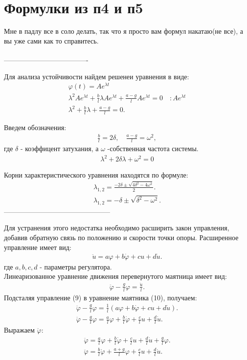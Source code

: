 \documentclass[12pt]{article}
\begin{document}
\section{Формулки из п4 и п5}

Мне в падлу все в соло делать, так что я просто вам формул накатаю(не все), а вы уже сами как то справитесь.
\\\\
-------------------------------------

Для анализа устойчивости найдем решенеи уравнения в виде:
\begin{gather}
\varphi(t)=Ae^{\lambda t}\nonumber\\
\lambda^2Ae^{\lambda t}+\frac{b}{l}\lambda Ae^{\lambda t}+\frac{a-g}{l} Ae^{\lambda t}=0    \quad:Ae^{\lambda t}\nonumber\\
\lambda^2+\frac{b}{l}\lambda+\frac{a-g}{l}=0.\nonumber
\end{gather}

Введем обозначения:
\begin{gather}
\frac{b}{l}=2\delta, \quad \frac{a-g}{l}=\omega^2,\nonumber
\end{gather}
где $\delta$ - коэффицент затухания, а $\omega$ -собственная частота системы.
\begin{gather}
\lambda^2 +2\delta\lambda+\omega^2=0
\end{gather}

Корни характеристического уравнения находятся по формуле:
\begin{gather}
\lambda_{1,2} = \frac{-2\delta\pm\sqrt{4\delta^2-4\omega^2}}{2}.\nonumber\\
\lambda_{1,2} = -\delta \pm \sqrt{\delta^2-\omega^2}.
\end{gather}
-----------------------------------------------

Для устранения этого недостатка необходимо расширить закон управления, добавив обратную
связь по положению и скорости точки опоры. Расширенное управление имеет вид:
\begin{gather}
\ddot{u}=a\varphi+b\dot{\varphi} +cu+d\dot{u}.
\end{gather}
где $a,b,c,d$ - параметры регулятора.\\
Линеаризованное уравнение движения перевернутого маятница имеет вид:
\begin{gather}
\ddot{\varphi}- \frac{g}{l}\varphi=\frac{\ddot{u}}{l}.
\end{gather}
Подсталяя управление (9) в уравнение маятника (10), получаем:
\begin{gather}
\ddot{\varphi}-\frac{g}{l}\varphi=\frac{1}{l}(a\varphi+b\dot{\varphi}+cu+d\dot{u}).\nonumber\\
\ddot{\varphi}-\frac{g}{l}\varphi=\frac{a}{l}\varphi+\frac{b}{l}\dot{\varphi}+\frac{c}{l}u+\frac{d}{l}\dot{u}.
\end{gather}
Выражаем $\ddot{\varphi}$:
\begin{gather}
\ddot{\varphi}=\frac{a}{l}\varphi+\frac{b}{l}\dot{\varphi}+\frac{c}{l}u+\frac{d}{l}\dot{u}+\frac{g}{l}\varphi.\nonumber\\
\ddot{\varphi}=\frac{b}{l}\dot{\varphi}+\frac{a+g}{l}\varphi+\frac{c}{l}u+\frac{d}{l}\dot{u}.
\end{gather}
\end{document}
